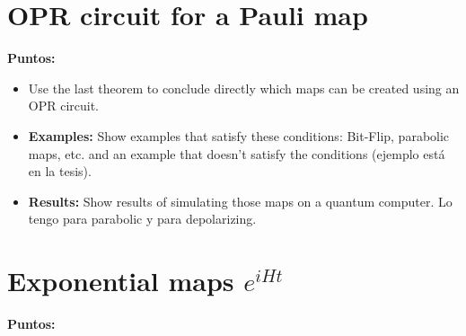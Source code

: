 \documentclass[10pt,letterpaper]{article} %
\begin{document}
\section*{OPR circuit for a Pauli map} %
\label{sec: OPR circuit for a Pauli map}
\textbf{Puntos:}
\begin{itemize}
\item Use the last theorem to conclude directly which maps can be created using an OPR circuit.
\item \textbf{Examples:} Show examples that satisfy these conditions: Bit-Flip, parabolic maps, etc. 
and an example that doesn't satisfy the conditions (ejemplo está en la tesis).
\item \textbf{Results:} Show results of simulating those maps on a quantum computer. 
Lo tengo para parabolic y para depolarizing.
\end{itemize}
\section*{Exponential maps $e^{iHt}$} %
\label{sec: Exponential maps}
\textbf{Puntos:}
\end{document}
